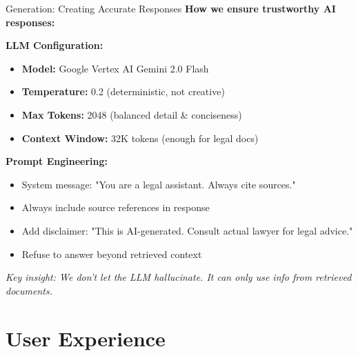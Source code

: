 \documentclass[11pt,aspectratio=16:9]{beamer}
\begin{document}
\begin{frame}{Generation: Creating Accurate Responses}
    \textbf{How we ensure trustworthy AI responses:}
    
    \vspace{0.5cm}
    
    \textbf{LLM Configuration:}
    \begin{itemize}
        \item \textbf{Model:} Google Vertex AI Gemini 2.0 Flash
        \item \textbf{Temperature:} 0.2 (deterministic, not creative)
        \item \textbf{Max Tokens:} 2048 (balanced detail \& conciseness)
        \item \textbf{Context Window:} 32K tokens (enough for legal docs)
    \end{itemize}
    
    \vspace{0.5cm}
    
    \textbf{Prompt Engineering:}
    \begin{itemize}
        \item System message: "You are a legal assistant. Always cite sources."
        \item Always include source references in response
        \item Add disclaimer: "This is AI-generated. Consult actual lawyer for legal advice."
        \item Refuse to answer beyond retrieved context
    \end{itemize}
    
    \vspace{0.5cm}
    
    {\small \textit{Key insight: We don't let the LLM hallucinate. It can only use info from retrieved documents.}}
\end{frame}

\section{User Experience}
\end{document}
